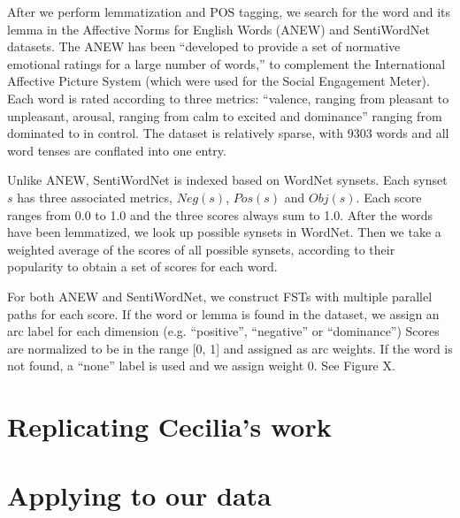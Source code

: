 \documentclass{article}
\begin{document}
After we perform lemmatization and POS tagging, we search for the word and its lemma in the Affective Norms for English Words (ANEW) and SentiWordNet datasets. The ANEW has been ``developed to provide a set of normative emotional ratings for a large number of words,'' to complement the International Affective Picture System (which were used for the Social Engagement Meter). Each word is rated according to three metrics: ``valence, ranging from pleasant to unpleasant, arousal, ranging from calm to excited and dominance'' ranging from dominated to in control. \cite{Bradley:1999} The dataset is relatively sparse, with 9303 words and all word tenses are conflated into one entry.

Unlike ANEW, SentiWordNet is indexed based on WordNet synsets. Each synset $s$ has three associated metrics, $Neg(s)$, $Pos(s)$ and $Obj(s)$. Each score ranges from 0.0 to 1.0 and the three scores always sum to 1.0. \cite{Esuli} After the words have been lemmatized, we look up possible synsets in WordNet. Then we take a weighted average of the scores of all possible synsets, according to their popularity to obtain a set of scores for each word.

For both ANEW and SentiWordNet, we construct FSTs with multiple parallel paths for each score. If the word or lemma is found in the dataset, we assign an arc label for each dimension (e.g. ``positive'', ``negative'' or ``dominance'') Scores are normalized to be in the range [0, 1] and assigned as arc weights. If the word is not found, a ``none'' label is used and we assign weight 0. See Figure X. 



\section{Replicating Cecilia's work}

\section{Applying to our data}

\vfill
\pagebreak



\end{document}
